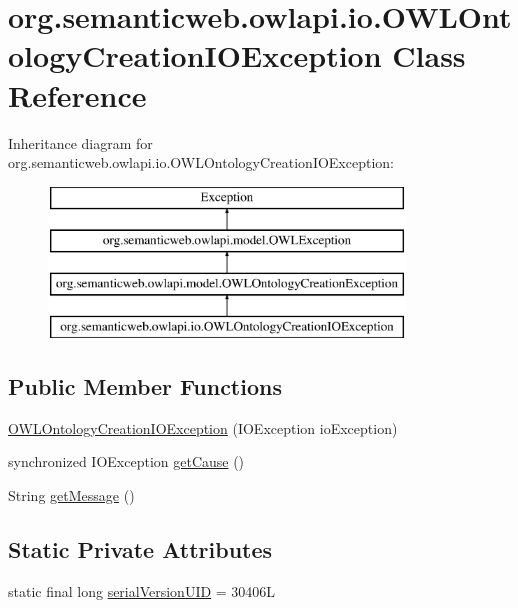 \hypertarget{classorg_1_1semanticweb_1_1owlapi_1_1io_1_1_o_w_l_ontology_creation_i_o_exception}{\section{org.\-semanticweb.\-owlapi.\-io.\-O\-W\-L\-Ontology\-Creation\-I\-O\-Exception Class Reference}
\label{classorg_1_1semanticweb_1_1owlapi_1_1io_1_1_o_w_l_ontology_creation_i_o_exception}
}
Inheritance diagram for org.\-semanticweb.\-owlapi.\-io.\-O\-W\-L\-Ontology\-Creation\-I\-O\-Exception\-:\begin{figure}[H]
\begin{center}
\leavevmode
\includegraphics[height=4.000000cm]{classorg_1_1semanticweb_1_1owlapi_1_1io_1_1_o_w_l_ontology_creation_i_o_exception}
\end{center}
\end{figure}
\subsection*{Public Member Functions}
\begin{DoxyCompactItemize}
\item 
\hyperlink{classorg_1_1semanticweb_1_1owlapi_1_1io_1_1_o_w_l_ontology_creation_i_o_exception_a9c283258b243ebd1882b80799e014f84}{O\-W\-L\-Ontology\-Creation\-I\-O\-Exception} (I\-O\-Exception io\-Exception)
\item 
synchronized I\-O\-Exception \hyperlink{classorg_1_1semanticweb_1_1owlapi_1_1io_1_1_o_w_l_ontology_creation_i_o_exception_aa2f3ce9dba86712a0395afd9282ad3c2}{get\-Cause} ()
\item 
String \hyperlink{classorg_1_1semanticweb_1_1owlapi_1_1io_1_1_o_w_l_ontology_creation_i_o_exception_a55d138d2c165c1e37a7969619c7b1c54}{get\-Message} ()
\end{DoxyCompactItemize}
\subsection*{Static Private Attributes}
\begin{DoxyCompactItemize}
\item 
static final long \hyperlink{classorg_1_1semanticweb_1_1owlapi_1_1io_1_1_o_w_l_ontology_creation_i_o_exception_aad20bc608323bbb2b5220b50d9f4b8cc}{serial\-Version\-U\-I\-D} = 30406\-L
\end{DoxyCompactItemize}
